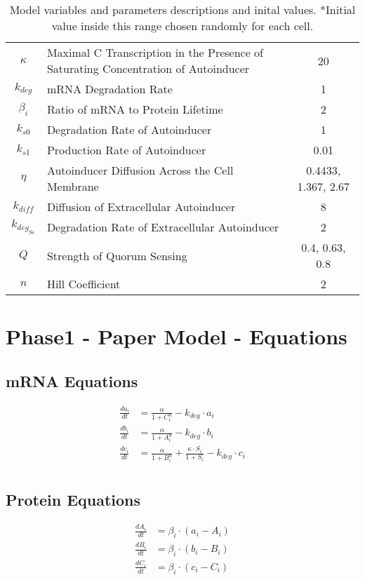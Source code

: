 \documentclass[fleqn]{article}
\begin{document}
\begin{table}[h!]
\begin{tabular}{|c|l|c|}
$\kappa$ & Maximal C Transcription in the Presence of Saturating Concentration of Autoinducer & 20 \\
$k_{deg}$ & mRNA Degradation Rate & 1 \\
$\beta_i$ & Ratio of mRNA to Protein Lifetime & 2 \\
$k_{s0}$ & Degradation Rate of Autoinducer & 1 \\
$k_{s1}$ & Production Rate of Autoinducer & 0.01 \\
$\eta$ & Autoinducer Diffusion Across the Cell Membrane & 0.4433, 1.367, 2.67 \\
$k_{diff}$ & Diffusion of Extracellular Autoinducer & 8 \\
$k_{deg_{Se}}$ & Degradation Rate of Extracellular Autoinducer & 2 \\
$Q$ & Strength of Quorum Sensing & 0.4, 0.63, 0.8 \\
$n$ & Hill Coefficient & 2 \\
\hline
\end{tabular}
\caption{Model variables and parameters descriptions and inital values. *Initial value inside this range chosen randomly for each cell.}
\end{table}





\pagebreak

\section*{Phase1 - Paper Model - Equations}

\subsection*{mRNA Equations}
\begin{align*}
\frac{da_i}{dt} &= \frac{\alpha}{1 + C_i^n} - k_{deg} \cdot a_i \\
\frac{db_i}{dt} &= \frac{\alpha}{1 + A_i^n} - k_{deg} \cdot b_i \\
\frac{dc_i}{dt} &= \frac{\alpha}{1 + B_i^n} + \frac{\kappa \cdot S_i}{1 + S_i} - k_{deg} \cdot c_i \\
\end{align*}

\subsection*{Protein Equations}
\begin{align*}
\frac{dA_i}{dt} &= \beta_i \cdot (a_i - A_i) \\
\frac{dB_i}{dt} &= \beta_i \cdot (b_i - B_i) \\
\frac{dC_i}{dt} &= \beta_i \cdot (c_i - C_i) \\
\end{align*}
\end{document}
